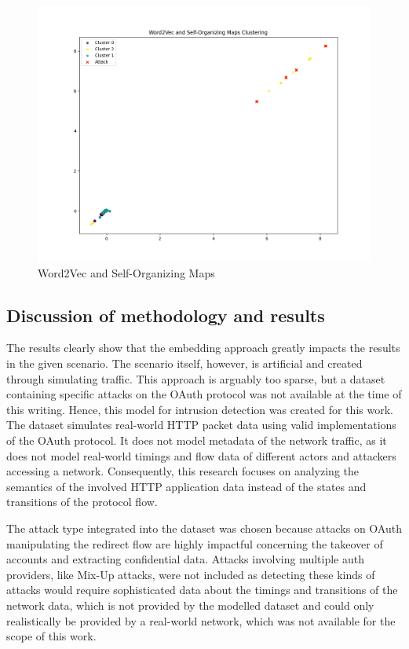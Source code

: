 \documentclass[
    fontsize=12pt,
    headings=small,
    parskip=half,           %
    bibliography=totoc,
    numbers=noenddot,       %
    open=any,               %
    ]{scrreprt}
\begin{document}
\begin{figure}[H]
	\caption{Word2Vec and Self-Organizing Maps}
	\label{fig:som_clusters}
	\sffamily\footnotesize
	\includegraphics[width=1\textwidth]{pic/som_final.png}
	\unitlength=0.75mm
	\linethickness{0.4pt}
\end{figure}


\subsection{Discussion of methodology and results}
\label{subsec:results_discussion}

The results clearly show that the embedding approach greatly impacts the results in the given scenario. The scenario itself, however, is artificial and created through simulating traffic. This approach is arguably too sparse, but a dataset containing specific attacks on the OAuth protocol was not available at the time of this writing. Hence, this model for intrusion detection was created for this work. The dataset simulates real-world HTTP packet data using valid implementations of the OAuth protocol. It does not model metadata of the network traffic, as it does not model real-world timings and flow data of different actors and attackers accessing a network. Consequently, this research focuses on analyzing the semantics of the involved HTTP application data instead of the states and transitions of the protocol flow. 

The attack type integrated into the dataset was chosen because attacks on OAuth manipulating the redirect flow are highly impactful concerning the takeover of accounts and extracting confidential data. Attacks involving multiple auth providers, like Mix-Up attacks, were not included as detecting these kinds of attacks would require sophisticated data about the timings and transitions of the network data, which is not provided by the modelled dataset and could only realistically be provided by a real-world network, which was not available for the scope of this work.
\end{document}
